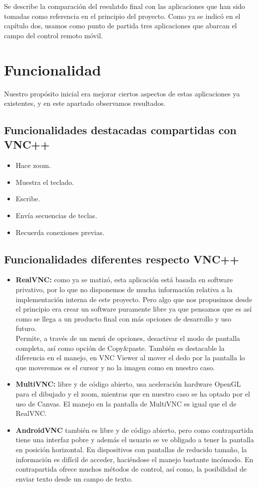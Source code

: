 Se describe la comparación del resulatdo final con las aplicaciones que han sido tomadas como referencia en el principio del proyecto. Como ya se indicó en el capítulo dos, usamos como punto de partida tres aplicaciones que abarcan el campo del control remoto móvil.

\section{Funcionalidad}

Nuestro propósito inicial era mejorar ciertos aspectos de estas aplicaciones ya existentes, y en este apartado observamos resultados.

\subsection{Funcionalidades destacadas compartidas con VNC++}
\begin{itemize}
\item Hace zoom.
\item Muestra el teclado.
\item Escribe.
\item Envía secuencias de teclas.
\item Recuerda conexiones previas.
\end{itemize}
\subsection{Funcionalidades diferentes respecto VNC++}
\begin{itemize}
\item \textbf{RealVNC:} como ya se matizó, esta aplicación está basada en software privativo, por lo que no disponemos de mucha información relativa a la implementación interna de este proyecto. Pero algo que nos propusimos desde el principio era crear un software puramente libre ya que pensamos que es así como se llega a un producto final con más opciones de desarrollo y uso futuro.\\

Permite, a través de un menú de opciones, desactivar el modo de pantalla completa, así como opción de Copy\&paste. También es destacable la diferencia en el manejo, en VNC Viewer al mover el dedo por la pantalla lo que moveremos es el cursor y no la imagen como en nuestro caso.
\item \textbf{MultiVNC:} libre y de código abierto, usa aceleración hardware OpenGL para el dibujado y el zoom, mientras que en nuestro caso se ha optado por el uso de Canvas. El manejo en la pantalla de MultiVNC es igual que el de RealVNC.
\item \textbf{AndroidVNC} también es libre y de código abierto, pero como contrapartida tiene una interfaz pobre y además el usuario se ve obligado a tener la pantalla en posición horizontal. En dispositivos con pantallas de reducido tamaño, la información es difícil de acceder, haciéndose el manejo bastante incómodo. En contrapartida ofrece muchos métodos de control, así como, la posibilidad de enviar texto desde un campo de texto.
\end{itemize}
